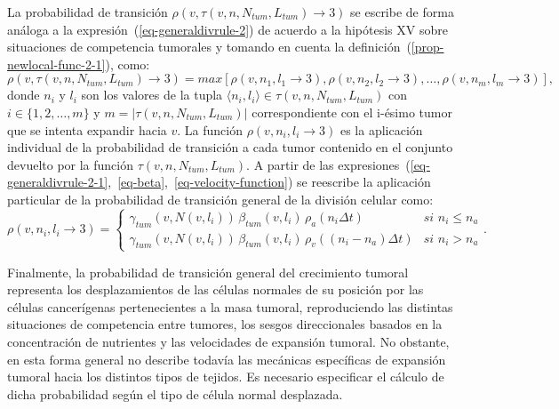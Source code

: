La probabilidad de transici\'on $\rho(v,\tau(v,n,N_{tum},L_{tum}) \rightarrow 3)$ se escribe de forma an\'aloga a la expresi\'on~(\ref{eq-generaldivrule-2}) de acuerdo a la hip\'otesis XV sobre situaciones de competencia tumorales y tomando en cuenta la definici\'on~(\ref{prop-newlocal-func-2-1}), como:
\begin{equation}
\rho(v,\tau(v,n,N_{tum},L_{tum}) \rightarrow 3) = max\left[\rho(v, n_1, l_1 \rightarrow 3),\rho(v, n_2, l_2 \rightarrow 3),\ldots, \rho(v, n_m, l_m \rightarrow 3)\right], \label{eq-generaldivrule-2-1}
\end{equation}
donde $n_i$ y $l_i$ son los valores de la tupla $\langle n_i, l_i \rangle \in \tau(v,n,N_{tum},L_{tum})$ con $i \in \lbrace 1,2,\ldots,m \rbrace$ y $m=|\tau(v,n,N_{tum},L_{tum})|$ correspondiente con el i-\'esimo tumor que se intenta expandir hacia $v$. La funci\'on $\rho(v, n_i, l_i \rightarrow 3)$ es la aplicaci\'on individual de la probabilidad de transici\'on a cada tumor contenido en el conjunto devuelto por la funci\'on $\tau(v,n,N_{tum},L_{tum})$. A partir de las expresiones~(\ref{eq-generaldivrule-2-1},~\ref{eq-beta},~\ref{eq-velocity-function}) se reescribe la aplicaci\'on particular de la probabilidad de transici\'on general de la divisi\'on celular como:
\begin{equation}
\rho(v,n_i,l_i \rightarrow 3) = \left\lbrace
	\begin{array}{ll}
		\gamma_{tum}(v,N(v,l_i))\,\beta_{tum}(v,l_i)\,\rho_a(n_i \Delta t)& \textit{si } n_i \leq n_a \\
		\gamma_{tum}(v,N(v,l_i))\,\beta_{tum}(v,l_i)\,\rho_v((n_i - n_a) \Delta t)& \textit{si } n_i > n_a
	\end{array}
\right.. \label{eq-generaldivrule-2-2}
\end{equation}

Finalmente, la probabilidad de transici\'on general del crecimiento tumoral representa los desplazamientos de las c\'elulas normales de su posici\'on por las c\'elulas cancer\'igenas pertenecientes a la masa tumoral, reproduciendo las distintas situaciones de competencia entre tumores, los sesgos direccionales basados en la concentraci\'on de nutrientes y las velocidades de expansi\'on tumoral. No obstante, en esta forma general no describe todav\'ia las mec\'anicas espec\'ificas de expansi\'on tumoral hacia los distintos tipos de tejidos. Es necesario especificar el c\'alculo de dicha probabilidad seg\'un el tipo de c\'elula normal desplazada.

